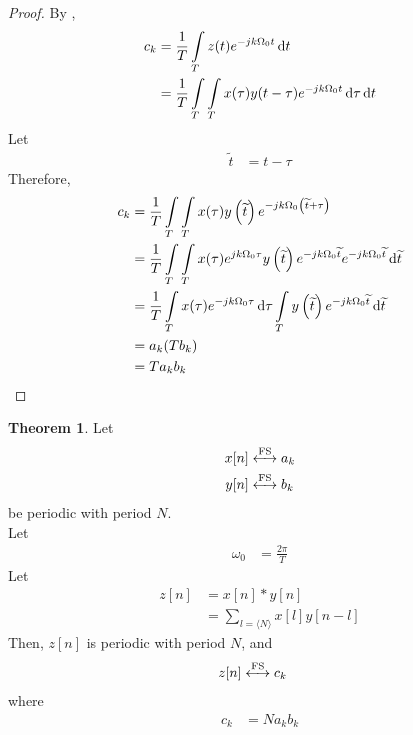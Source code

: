 \documentclass[titlepage, fleqn, a4paper, 12pt, twoside]{article}
\theoremstyle{definition}
\theoremstyle{theorem}
\newtheorem{theorem}{Theorem}
\newcommand{\FS}{\xleftrightarrow{\mathrm{FS}}}
\renewcommand{\tilde}{\widetilde}
\begin{document}
\begin{proof}
	By ,
	\begin{align*}
		c_k &= \frac{1}{T} \int\limits_{T} z(t) e^{-j k \Omega_0 t} \dif t\\
		&= \frac{1}{T} \int\limits_{T} \int\limits_{T} x(\tau) y(t - \tau) e^{-j k \Omega_0 t} \dif \tau \dif t
	\end{align*}
	Let
	\begin{align*}
		\tilde{t} &= t - \tau
	\end{align*}
	Therefore,
	\begin{align*}
		c_k &= \frac{1}{T} \int\limits_{T} \int\limits_{T} x(\tau) y\left( \tilde{t} \right) e^{-j k \Omega_0 \left( \tilde{t} + \tau \right)}\\
		&= \frac{1}{T} \int\limits_{T} \int\limits_{T} x(\tau) e^{j k \Omega_0 \tau} y\left( \tilde{t} \right) e^{-j k \Omega_0 \tilde{t}} e^{-j k \Omega_0 \tilde{t}} \dif \tilde{t}\\
		&= \frac{1}{T} \int\limits_{T} x(\tau) e^{-j k \Omega_0 \tau} \dif \tau \int\limits_{T} y\left( \tilde{t} \right) e^{-j k \Omega_0 \tilde{t}} \dif \tilde{t}\\
		&= a_k (T b_k)\\
		&= T a_k b_k
	\end{align*}
\end{proof}

\begin{theorem}
	Let
	\begin{align*}
		x[n] &\FS a_k\\
		y[n] &\FS b_k
	\end{align*}
	be periodic with period $N$.\\
	Let
	\begin{align*}
		\omega_0 &= \frac{2 \pi}{T}
	\end{align*}
	Let
	\begin{align*}
		z[n] &= x[n] \ast y[n]\\
		&= \sum\limits_{l = \langle N \rangle} x[l] y[n - l]
	\end{align*}
	Then, $z[n]$ is periodic with period $N$, and
	\begin{align*}
		z[n] &\FS c_k
	\end{align*}
	where
	\begin{align*}
		c_k &= N a_k b_k
	\end{align*}
\end{theorem}
\end{document}
